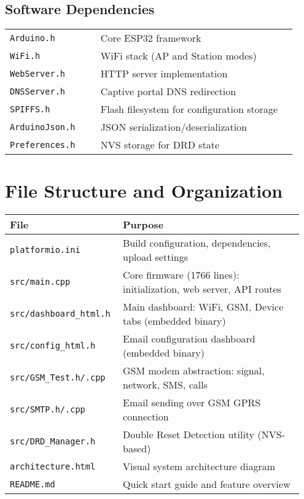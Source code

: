 \documentclass[11pt,a4paper]{article}
\begin{document}
\subsection{Software Dependencies}
\begin{longtable}{>{\raggedright\arraybackslash}p{0.3\linewidth} p{0.65\linewidth}}
\texttt{Arduino.h} & Core ESP32 framework \\
\texttt{WiFi.h} & WiFi stack (AP and Station modes) \\
\texttt{WebServer.h} & HTTP server implementation \\
\texttt{DNSServer.h} & Captive portal DNS redirection \\
\texttt{SPIFFS.h} & Flash filesystem for configuration storage \\
\texttt{ArduinoJson.h} & JSON serialization/deserialization \\
\texttt{Preferences.h} & NVS storage for DRD state \\
\end{longtable}

\section{File Structure and Organization}

\begin{longtable}{>{\raggedright\arraybackslash}p{0.35\linewidth} p{0.6\linewidth}}
\hline
\textbf{File} & \textbf{Purpose} \\
\hline
\endhead
\texttt{platformio.ini} & Build configuration, dependencies, upload settings \\
\texttt{src/main.cpp} & Core firmware (1766 lines): initialization, web server, API routes \\
\texttt{src/dashboard\_html.h} & Main dashboard: WiFi, GSM, Device tabs (embedded binary) \\
\texttt{src/config\_html.h} & Email configuration dashboard (embedded binary) \\
\texttt{src/GSM\_Test.h/.cpp} & GSM modem abstraction: signal, network, SMS, calls \\
\texttt{src/SMTP.h/.cpp} & Email sending over GSM GPRS connection \\
\texttt{src/DRD\_Manager.h} & Double Reset Detection utility (NVS-based) \\
\texttt{architecture.html} & Visual system architecture diagram \\
\texttt{README.md} & Quick start guide and feature overview \\
\hline
\end{longtable}
\end{document}
